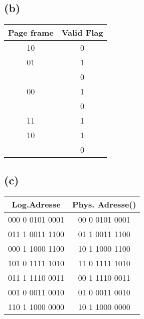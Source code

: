 \documentclass[12pt,a4paper]{scrartcl}
\begin{document}
		\subsection*{(b)}
		\begin{longtable}{|c|c|}\hline
			Page frame&Valid Flag\\\hline
			\hline
			10&0\\\hline
			01&1\\\hline
			&0\\\hline
			00&1\\\hline
			&0\\\hline
			11&1\\\hline
			10&1\\\hline
			&0\\\hline
		\end{longtable}
		\subsection*{(c)}
		\begin{longtable}{|c|c|}
			\hline
			Log.Adresse&Phys. Adresse()\\\hline\hline
			000 0 0101 0001&00 0 0101 0001\\\hline
			011 1 0011 1100&01 1 0011 1100\\\hline
			000 1 1000 1100&10 1 1000 1100\\\hline
			101 0 1111 1010&11 0 1111 1010\\\hline
			011 1 1110 0011&00 1 1110 0011\\\hline
			001 0 0011 0010&01 0 0011 0010\\\hline
			110 1 1000 0000&10 1 1000 0000\\\hline
		\end{longtable}
\end{document}
